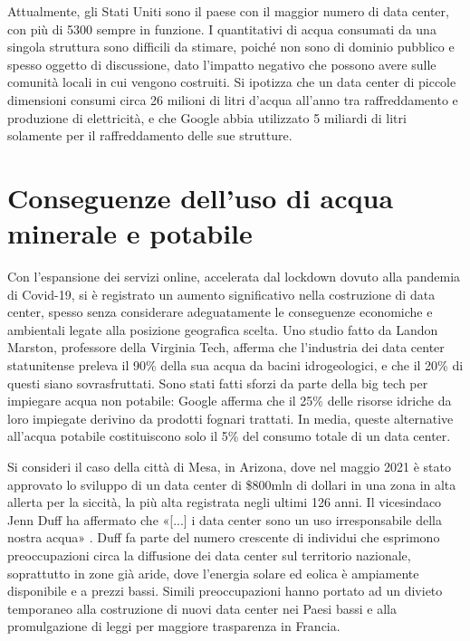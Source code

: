 \documentclass[12pt,a4paper,oneside]{book}
\begin{document}
Attualmente, gli Stati Uniti sono il paese con il maggior numero di data center, con più di 5300 sempre in funzione. I quantitativi di acqua consumati da una singola struttura sono difficili da stimare, poiché non sono di dominio pubblico e spesso oggetto di discussione, dato l'impatto negativo che possono avere sulle comunità locali in cui vengono costruiti. Si ipotizza che un data center di piccole dimensioni consumi circa 26 milioni di litri d'acqua all'anno tra raffreddamento e produzione di elettricità, e che Google abbia utilizzato 5 miliardi di litri solamente per il raffreddamento delle sue strutture.

\section{Conseguenze dell'uso di acqua minerale e potabile}

Con l'espansione dei servizi online, accelerata dal lockdown dovuto alla pandemia di Covid-19, si è registrato un aumento significativo nella costruzione di data center, spesso senza considerare adeguatamente le conseguenze economiche e ambientali legate alla posizione geografica scelta.
Uno studio fatto da Landon Marston, professore della Virginia Tech, afferma che l'industria dei data center statunitense preleva il 90\% della sua acqua da bacini idrogeologici, e che il 20\% di questi siano sovrasfruttati. Sono stati fatti sforzi da parte della big tech per impiegare acqua non potabile: Google afferma che il 25\% delle risorse idriche da loro impiegate derivino da prodotti fognari trattati. In media, queste alternative all'acqua potabile costituiscono solo il 5\% del consumo totale di un data center. 

Si consideri il caso della città di Mesa, in Arizona, dove nel maggio 2021 è stato approvato lo sviluppo di un data center di \$800mln di dollari in una zona in alta allerta per la siccità, la più alta registrata negli ultimi 126 anni. Il vicesindaco Jenn Duff ha affermato che «[...] i data center sono un uso irresponsabile della nostra acqua» \cite{nbc2021drought}. Duff fa parte del numero crescente di individui che esprimono preoccupazioni circa la diffusione dei data center sul territorio nazionale, soprattutto in zone già aride, dove l'energia solare ed eolica è ampiamente disponibile e a prezzi bassi. 
Simili preoccupazioni hanno portato ad un divieto temporaneo alla costruzione di nuovi data center nei Paesi bassi e alla promulgazione di leggi per maggiore trasparenza in Francia.
\end{document}
